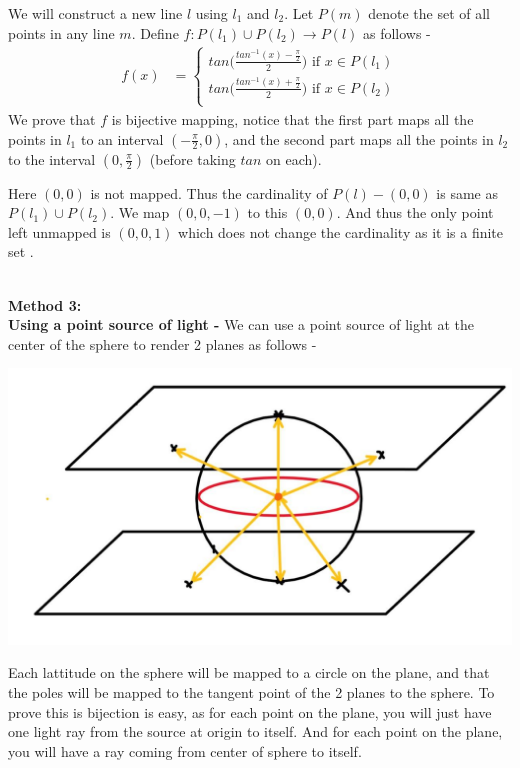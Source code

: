 \documentclass[12pt]{scrartcl}
\begin{document}
We will construct a new line $l$ using $l_1$ and $l_2$. Let $P(m)$ denote the set of all points in any line $m$. Define $f:P(l_1) \cup P(l_2) \rightarrow P(l)$ as follows - 
\begin{align*}
f(x) &=
    \begin{cases}
     tan\bigg(\frac{tan^{-1}(x) -  \frac{\pi}{2}}{2}\bigg) \text{ if $x \in P(l_1)$}\\ 
     tan\bigg(\frac{tan^{-1}(x) + \frac{\pi}{2}}{2}\bigg) \text{ if $x \in P(l_2)$}\\
    \end{cases}
\end{align*}
We prove that $f$ is bijective mapping, notice that the first part maps all the points in $l_1$ to an interval $(-\frac{\pi}{2},0)$, and the second part maps all the points in $l_2$ to the interval $(0,\frac{\pi}{2})$ (before taking $tan$ on each).

 Here $(0,0)$ is not mapped. Thus the cardinality of $P(l) - (0,0)$ is same as $P(l_1) \cup P(l_2)$. We map $(0,0,-1)$ to this $(0,0)$.
 And thus the only point left unmapped is $(0,0,1)$  which does not change the cardinality as it is a finite set .

\\ \textbf{Method 3:}
\\ \textbf{Using a point source of light -} 
We can use a point source of light at the center of the sphere to render 2 planes as follows - 

\begin{center}
    \includegraphics[width=0.7\linewidth]{photo_2020-11-02_11-44-00.jpg}
\end{center}
Each lattitude on the sphere will be mapped to a circle on the plane, and that the poles will be mapped to the tangent point of the 2 planes to the sphere. To prove this is bijection is easy, as for each point on the plane, you will just have one light ray from the source at origin to itself. And for each point on the plane, you will have a ray coming from center of sphere to itself.
\end{document}
